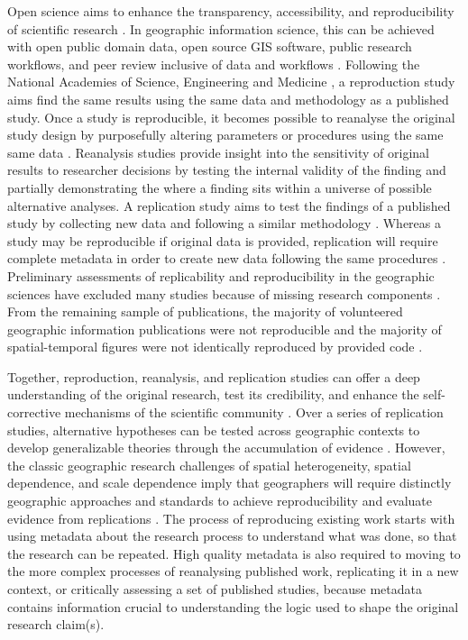 \documentclass{isprs} %
\begin{document}
Open science aims to enhance the transparency, accessibility, and reproducibility of scientific research \citep{NASEM2018}.
In geographic information science, this can be achieved with open public domain data, open source GIS software, public research workflows, and peer review inclusive of data and workflows \citep{Singleton2016}. 
Following the National Academies of Science, Engineering and Medicine \citep{NASEM2019}, a reproduction study aims find the same results using the same data and methodology as a published study.
Once a study is reproducible, it becomes possible to reanalyse the original study design by purposefully altering parameters or procedures using the same same data \citep{Christensen2019}. 
Reanalysis studies provide insight into the sensitivity of original results to researcher decisions by testing the internal validity of the finding and partially demonstrating the where a finding sits within a universe of possible alternative analyses. 
A replication study aims to test the findings of a published study by collecting new data and following a similar methodology \citep{NASEM2019}.
Whereas a study may be reproducible if original data is provided, replication will require complete metadata in order to create new data following the same procedures \citep{Ostermann2017}.
Preliminary assessments of replicability and reproducibility in the geographic sciences have excluded many studies because of missing research components \citep{Ostermann2017,Konkol2019}.
From the remaining sample of publications, the majority of volunteered geographic information publications were not reproducible \citep{Ostermann2017} and the majority of spatial-temporal figures were not identically reproduced by provided code \citep{Konkol2019}.

Together, reproduction, reanalysis, and replication studies can offer a deep understanding of the original research, test its credibility, and enhance the self-corrective mechanisms of the scientific community \citep{Christensen2019,NASEM2019}.
Over a series of replication studies, alternative hypotheses can be tested across geographic contexts to develop generalizable theories through the accumulation of evidence \citep{Kedron2022}.
However, the classic geographic research challenges of spatial heterogeneity, spatial dependence, and scale dependence imply that geographers will require distinctly geographic approaches and standards to achieve reproducibility \citep{Kedron2021,Brunsdon2020} and evaluate evidence from replications \citep{Kedron2022}.
The process of reproducing existing work starts with using metadata about the research process to understand what was done, so that the research can be repeated. 
High quality metadata is also required to moving to the more complex processes of reanalysing published work, replicating it in a new context, or critically assessing a set of published studies, because metadata contains information crucial to understanding the logic used to shape the original research claim(s).
\end{document}
